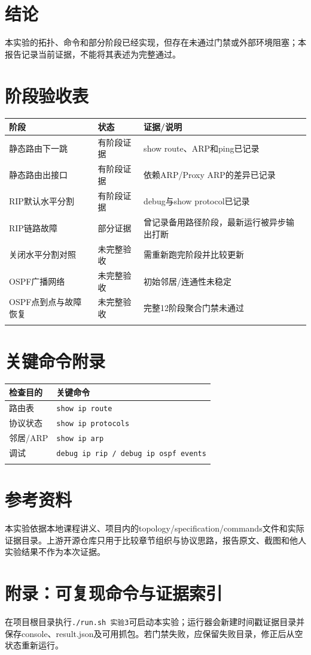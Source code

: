 \documentclass[UTF8,a4paper,12pt]{ctexart}
\begin{document}
\section{结论}
本实验的拓扑、命令和部分阶段已经实现，但存在未通过门禁或外部环境阻塞；本报告记录当前证据，不能将其表述为完整通过。
\section{阶段验收表}
\begin{longtable}{p{}p{}p{}}\toprule 阶段 & 状态 & 证据/说明\\\midrule
静态路由下一跳 & 有阶段证据 & show route、ARP和ping已记录\\
静态路由出接口 & 有阶段证据 & 依赖ARP/Proxy ARP的差异已记录\\
RIP默认水平分割 & 有阶段证据 & debug与show protocol已记录\\
RIP链路故障 & 部分证据 & 曾记录备用路径阶段，最新运行被异步输出打断\\
关闭水平分割对照 & 未完整验收 & 需重新跑完阶段并比较更新\\
OSPF广播网络 & 未完整验收 & 初始邻居/连通性未稳定\\
OSPF点到点与故障恢复 & 未完整验收 & 完整12阶段聚合门禁未通过\\\\\bottomrule\end{longtable}
\section{关键命令附录}
\begin{longtable}{p{}p{}}\toprule 检查目的 & 关键命令\\\midrule
路由表 & \texttt{show ip route}\\
协议状态 & \texttt{show ip protocols}\\
邻居/ARP & \texttt{show ip arp}\\
调试 & \texttt{debug ip rip / debug ip ospf events}\\\\\bottomrule\end{longtable}
\section{参考资料}
本实验依据本地课程讲义、项目内的topology/specification/commands文件和实际证据目录。上游开源仓库只用于比较章节组织与协议思路，报告原文、截图和他人实验结果不作为本次证据。
\section{附录：可复现命令与证据索引}
在项目根目录执行\texttt{./run.sh 实验3}可启动本实验；运行器会新建时间戳证据目录并保存console、result.json及可用抓包。若门禁失败，应保留失败目录，修正后从空状态重新运行。
\end{document}
